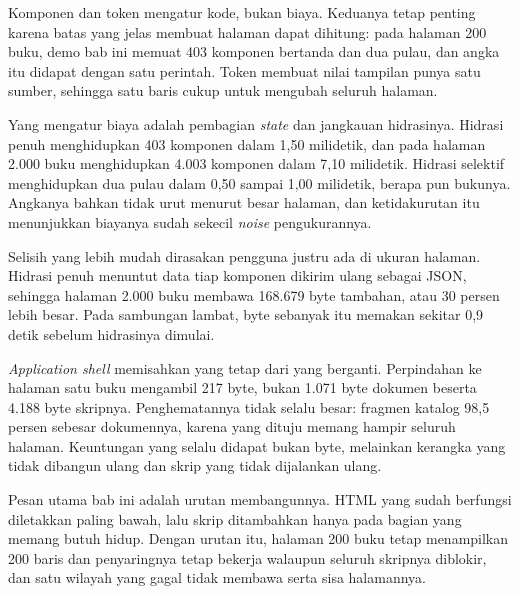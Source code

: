 Komponen dan token mengatur kode, bukan biaya. Keduanya tetap penting karena
batas yang jelas membuat halaman dapat dihitung: pada halaman 200 buku, demo
bab ini memuat 403 komponen bertanda dan dua pulau, dan angka itu didapat
dengan satu perintah. Token membuat nilai tampilan punya satu sumber,
sehingga satu baris cukup untuk mengubah seluruh halaman.

Yang mengatur biaya adalah pembagian \textit{state} dan jangkauan hidrasinya.
Hidrasi penuh menghidupkan 403 komponen dalam 1,50 milidetik, dan pada
halaman 2.000 buku menghidupkan 4.003 komponen dalam 7,10 milidetik. Hidrasi
selektif menghidupkan dua pulau dalam 0,50 sampai 1,00 milidetik, berapa pun
bukunya. Angkanya bahkan tidak urut menurut besar halaman, dan ketidakurutan
itu menunjukkan biayanya sudah sekecil \textit{noise} pengukurannya.

Selisih yang lebih mudah dirasakan pengguna justru ada di ukuran halaman.
Hidrasi penuh menuntut data tiap komponen dikirim ulang sebagai JSON,
sehingga halaman 2.000 buku membawa 168.679 byte tambahan, atau 30 persen
lebih besar. Pada sambungan lambat, byte sebanyak itu memakan sekitar 0,9
detik sebelum hidrasinya dimulai.

\textit{Application shell} memisahkan yang tetap dari yang berganti.
Perpindahan ke halaman satu buku mengambil 217 byte, bukan 1.071 byte
dokumen beserta 4.188 byte skripnya. Penghematannya tidak selalu besar:
fragmen katalog 98,5 persen sebesar dokumennya, karena yang dituju memang
hampir seluruh halaman. Keuntungan yang selalu didapat bukan byte, melainkan
kerangka yang tidak dibangun ulang dan skrip yang tidak dijalankan ulang.

Pesan utama bab ini adalah urutan membangunnya. HTML yang sudah berfungsi
diletakkan paling bawah, lalu skrip ditambahkan hanya pada bagian yang
memang butuh hidup. Dengan urutan itu, halaman 200 buku tetap menampilkan 200
baris dan penyaringnya tetap bekerja walaupun seluruh skripnya diblokir, dan
satu wilayah yang gagal tidak membawa serta sisa halamannya.
